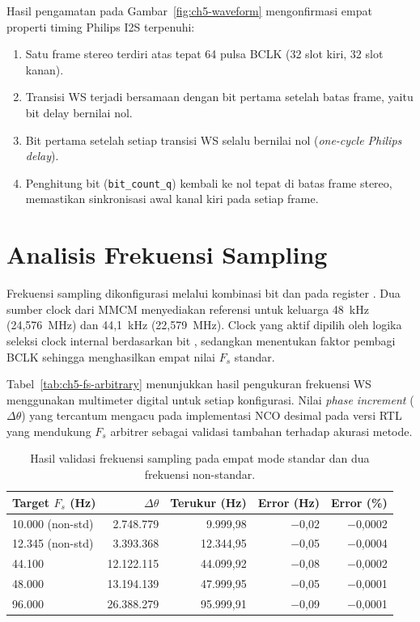 Hasil pengamatan pada Gambar~\ref{fig:ch5-waveform} mengonfirmasi empat properti timing Philips I2S \citep{philips_i2s_1986} terpenuhi:

\begin{enumerate}
	\item Satu frame stereo terdiri atas tepat 64 pulsa BCLK (32 slot kiri, 32 slot kanan).
	\item Transisi WS terjadi bersamaan dengan bit pertama setelah batas frame, yaitu bit delay bernilai nol.
	\item Bit pertama setelah setiap transisi WS selalu bernilai nol (\textit{one-cycle Philips delay}).
	\item Penghitung bit (\texttt{bit\_count\_q}) kembali ke nol tepat di batas frame stereo, memastikan sinkronisasi awal kanal kiri pada setiap frame.
\end{enumerate}

\section{Analisis Frekuensi Sampling}

Frekuensi sampling dikonfigurasi melalui kombinasi bit  dan  pada register . Dua sumber clock dari MMCM menyediakan referensi untuk keluarga 48~kHz (24,576~MHz) dan 44,1~kHz (22,579~MHz). Clock yang aktif dipilih oleh logika seleksi clock internal berdasarkan bit , sedangkan  menentukan faktor pembagi BCLK sehingga menghasilkan empat nilai $F_s$ standar.

Tabel~\ref{tab:ch5-fs-arbitrary} menunjukkan hasil pengukuran frekuensi WS menggunakan multimeter digital untuk setiap konfigurasi. Nilai \textit{phase increment} ($\Delta\theta$) yang tercantum mengacu pada implementasi NCO desimal pada versi RTL yang mendukung $F_s$ arbitrer sebagai validasi tambahan terhadap akurasi metode.

\begin{table}[htbp]
	\centering
	\caption{Hasil validasi frekuensi sampling pada empat mode standar dan dua frekuensi non-standar.}
	
	\begin{tabular}{|l|r|r|r|r|}
		\hline
		\textbf{Target $F_s$ (Hz)} & \textbf{$\Delta\theta$} &
		\textbf{Terukur (Hz)} & \textbf{Error (Hz)} & \textbf{Error (\%)} \\
		\hline
		10.000 (non-std) & 2.748.779  & 9.999,98  & $-$0,02 & $-$0,0002 \\
		12.345 (non-std) & 3.393.368  & 12.344,95 & $-$0,05 & $-$0,0004 \\
		44.100           & 12.122.115 & 44.099,92 & $-$0,08 & $-$0,0002 \\
		48.000           & 13.194.139 & 47.999,95 & $-$0,05 & $-$0,0001 \\
		96.000           & 26.388.279 & 95.999,91 & $-$0,09 & $-$0,0001 \\
		\hline
	\end{tabular}
\end{table}

